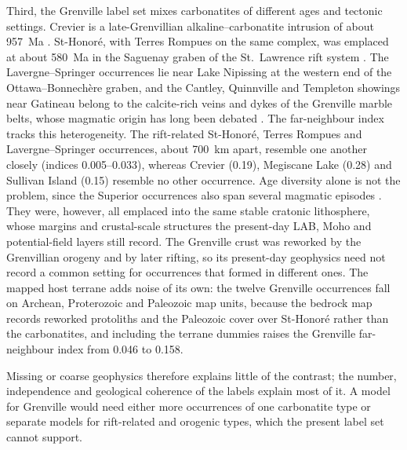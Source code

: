 \documentclass[pdflatex,sn-apa]{sn-jnl}
\begin{document}
Third, the Grenville label set mixes carbonatites of different ages and tectonic settings. Crevier is a late-Grenvillian alkaline--carbonatite intrusion of about 957~Ma \citep{Groulier2020}. St-Honoré, with Terres Rompues on the same complex, was emplaced at about 580~Ma in the Saguenay graben of the St.~Lawrence rift system \citep{Neron2018}. The Lavergne--Springer occurrences lie near Lake Nipissing at the western end of the Ottawa--Bonnech\`ere graben, and the Cantley, Quinnville and Templeton showings near Gatineau belong to the calcite-rich veins and dykes of the Grenville marble belts, whose magmatic origin has long been debated \citep{Moecher1997}. The far-neighbour index tracks this heterogeneity. The rift-related St-Honoré, Terres Rompues and Lavergne--Springer occurrences, about 700~km apart, resemble one another closely (indices 0.005--0.033), whereas Crevier (0.19), Megiscane Lake (0.28) and Sullivan Island (0.15) resemble no other occurrence. Age diversity alone is not the problem, since the Superior occurrences also span several magmatic episodes \citep{Rukhlov2010}. They were, however, all emplaced into the same stable cratonic lithosphere, whose margins and crustal-scale structures the present-day LAB, Moho and potential-field layers still record. The Grenville crust was reworked by the Grenvillian orogeny and by later rifting, so its present-day geophysics need not record a common setting for occurrences that formed in different ones. The mapped host terrane adds noise of its own: the twelve Grenville occurrences fall on Archean, Proterozoic and Paleozoic map units, because the bedrock map records reworked protoliths and the Paleozoic cover over St-Honoré rather than the carbonatites, and including the terrane dummies raises the Grenville far-neighbour index from 0.046 to 0.158.

Missing or coarse geophysics therefore explains little of the contrast; the number, independence and geological coherence of the labels explain most of it. A model for Grenville would need either more occurrences of one carbonatite type or separate models for rift-related and orogenic types, which the present label set cannot support.
\end{document}
